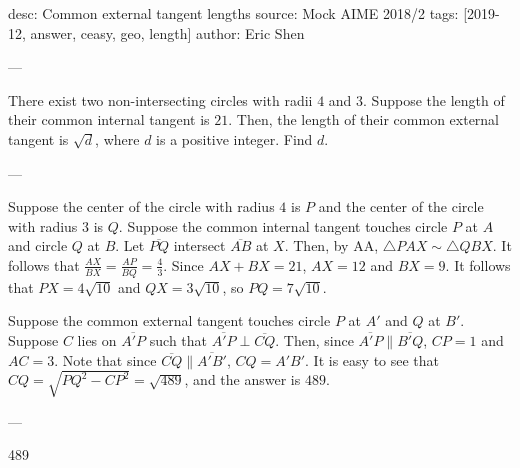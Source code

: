 desc: Common external tangent lengths
source: Mock AIME 2018/2
tags: [2019-12, answer, ceasy, geo, length]
author: Eric Shen

---

There exist two non-intersecting circles with radii $4$ and $3$. Suppose the length of their common internal tangent is $21$. Then, the length of their common external tangent is $\sqrt{d}$, where $d$ is a positive integer. Find $d$.

---

Suppose the center of the circle with radius $4$ is $P$ and the center of the circle with radius $3$ is $Q$. Suppose the common internal tangent touches circle $P$ at $A$ and circle $Q$ at $B$. Let $\overline{PQ}$ intersect $\overline{AB}$ at $X$. Then, by AA, $\triangle PAX\sim\triangle QBX$. It follows that $\frac{AX}{BX}=\frac{AP}{BQ}=\frac{4}{3}$. Since $AX+BX=21$, $AX=12$ and $BX=9$. It follows that $PX=4\sqrt{10}$ and $QX=3\sqrt{10}$, so $PQ=7\sqrt{10}$. 

Suppose the common external tangent touches circle $P$ at $A'$ and $Q$ at $B'$. Suppose $C$ lies on $\overline{A'P}$ such that $\overline{A'P}\perp\overline{CQ}$. Then, since $\overline{A'P}\parallel\overline{B'Q}$, $CP=1$ and $AC=3$. Note that since $\overline{CQ}\parallel\overline{A'B'}$, $CQ=A'B'$. It is easy to see that $CQ=\sqrt{PQ^2-CP^2}=\sqrt{489}$, and the answer is $489$.

---

489
